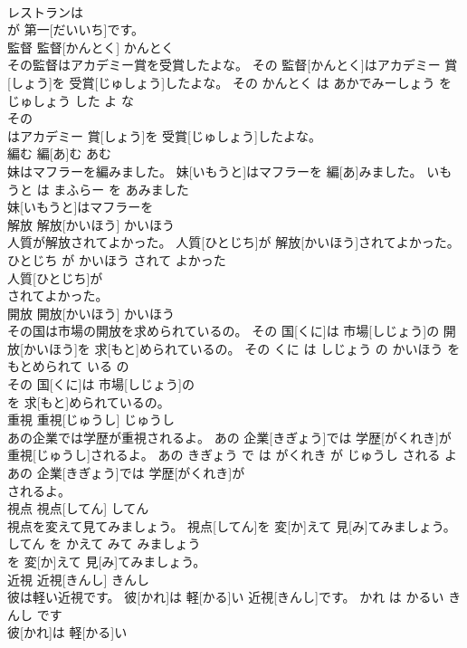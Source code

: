 \documentclass[8pt]{extreport}
\begin{document}
\begin{CJK}{UTF8}{min}
\\	レストランは
\\	が 第一[だいいち]です。			
\\	監督	監督[かんとく]	かんとく	
\\	その監督はアカデミー賞を受賞したよな。	その 監督[かんとく]はアカデミー 賞[しょう]を 受賞[じゅしょう]したよな。	その かんとく は あかでみーしょう を じゅしょう した よ な	
\\	その
\\	はアカデミー 賞[しょう]を 受賞[じゅしょう]したよな。			
\\	編む	編[あ]む	あむ	
\\	妹はマフラーを編みました。	妹[いもうと]はマフラーを 編[あ]みました。	いもうと は まふらー を あみました	
\\	妹[いもうと]はマフラーを
\\	解放	解放[かいほう]	かいほう	
\\	人質が解放されてよかった。	人質[ひとじち]が 解放[かいほう]されてよかった。	ひとじち が かいほう されて よかった	
\\	人質[ひとじち]が
\\	されてよかった。			
\\	開放	開放[かいほう]	かいほう	
\\	その国は市場の開放を求められているの。	その 国[くに]は 市場[しじょう]の 開放[かいほう]を 求[もと]められているの。	その くに は しじょう の かいほう を もとめられて いる の	
\\	その 国[くに]は 市場[しじょう]の
\\	を 求[もと]められているの。			
\\	重視	重視[じゅうし]	じゅうし	
\\	あの企業では学歴が重視されるよ。	あの 企業[きぎょう]では 学歴[がくれき]が 重視[じゅうし]されるよ。	あの きぎょう で は がくれき が じゅうし される よ	
\\	あの 企業[きぎょう]では 学歴[がくれき]が
\\	されるよ。			
\\	視点	視点[してん]	してん	
\\	視点を変えて見てみましょう。	視点[してん]を 変[か]えて 見[み]てみましょう。	してん を かえて みて みましょう	
\\	を 変[か]えて 見[み]てみましょう。			
\\	近視	近視[きんし]	きんし	
\\	彼は軽い近視です。	彼[かれ]は 軽[かる]い 近視[きんし]です。	かれ は かるい きんし です	
\\	彼[かれ]は 軽[かる]い

\end{CJK}
\end{document}
